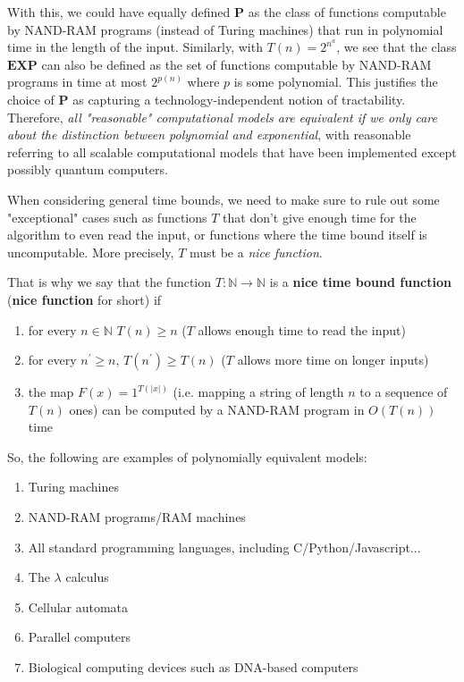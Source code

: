   With this, we could have equally defined $\mathbf{P}$ as the class of functions computable by NAND-RAM programs (instead of Turing machines) that run in polynomial time in the length of the input. Similarly, with $T(n) = 2^{n^a}$, we see that the class $\mathbf{EXP}$ can also be defined as the set of functions computable by NAND-RAM programs in time at most $2^{p(n)}$ where $p$ is some polynomial. This justifies the choice of $\mathbf{P}$ as capturing a technology-independent notion of tractability. Therefore, \textit{all "reasonable" computational models are equivalent if we only care about the distinction between polynomial and exponential}, with reasonable referring to all scalable computational models that have been implemented except possibly quantum computers. 

  When considering general time bounds, we need to make sure to rule out some "exceptional" cases such as functions $T$ that don't give enough time for the algorithm to even read the input, or functions where the time bound itself is uncomputable. More precisely, $T$ must be a \textit{nice function}. 

  \begin{definition}
  That is why we say that the function $T: \mathbb{N} \longrightarrow \mathbb{N}$ is a \textbf{nice time bound function} (\textbf{nice function} for short) if 
  \begin{enumerate}
      \item for every $n \in \mathbb{N}$ $T(n) \geq n$ ($T$ allows enough time to read the input)
      \item for every $n^\prime \geq n$, $T(n^\prime) \geq T(n)$ ($T$ allows more time on longer inputs)
      \item the map $F(x) = 1^{T(|x|)}$ (i.e. mapping a string of length $n$ to a sequence of $T(n)$ ones) can be computed by a NAND-RAM program in $O(T(n))$ time
  \end{enumerate}
  \end{definition}

  So, the following are examples of polynomially equivalent models: 
  \begin{enumerate}
      \item Turing machines
      \item NAND-RAM programs/RAM machines
      \item All standard programming languages, including C/Python/Javascript...
      \item The $\lambda$ calculus
      \item Cellular automata
      \item Parallel computers
      \item Biological computing devices such as DNA-based computers 
  \end{enumerate}

